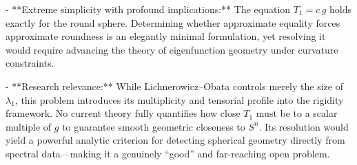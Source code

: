 - **Extreme simplicity with profound implications:** The equation \(T_1 = c\,g\) holds exactly for the round sphere.  Determining whether approximate equality forces approximate roundness is an elegantly minimal formulation, yet resolving it would require advancing the theory of eigenfunction geometry under curvature constraints.  

- **Research relevance:** While Lichnerowicz–Obata controls merely the size of \(\lambda_1\), this problem introduces its multiplicity and tensorial profile into the rigidity framework.  No current theory fully quantifies how close \(T_1\) must be to a scalar multiple of \(g\) to guarantee smooth geometric closeness to \(S^n\).  Its resolution would yield a powerful analytic criterion for detecting spherical geometry directly from spectral data—making it a genuinely “good” and far-reaching open problem.